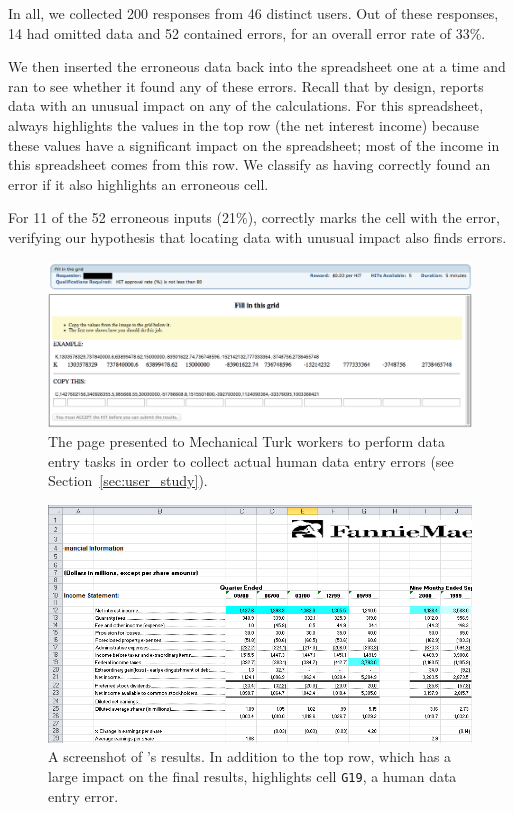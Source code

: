 In all, we collected 200 responses from 46 distinct users. Out of
these responses, 14 had omitted data and 52 contained errors, for an
overall error rate of 33\%.

We then inserted the erroneous data back into the spreadsheet one at a
time and ran \checkcell{} to see whether it found any of these
errors. Recall that by design, \checkcell{} reports data with an
unusual impact on any of the calculations. For this
spreadsheet, \checkcell{} always highlights the values in the top row
(the net interest income) because these values have a significant
impact on the spreadsheet; most of the income in this spreadsheet
comes from this row. We classify \checkcell{} as having correctly
found an error if it also highlights an erroneous cell.

For 11 of the 52 erroneous inputs (21\%), \checkcell{} correctly marks the
cell with the error, verifying our hypothesis that locating data with
unusual impact also finds errors.


\begin{figure}[!t]
\centering
\includegraphics[width=5in]{images/mturk_fuzz_task}
  \caption{The page presented to Mechanical Turk workers to perform data entry tasks in order to collect actual human data entry errors (see Section~\ref{sec:user_study}).\label{fig:mturk_task}}
\end{figure}


\begin{figure}[!t]
\centering
\includegraphics[width=5in]{images/fannie_mae_outlier}
  \caption{A screenshot of \checkcell{}'s results. In addition to the top row, which has a large impact on the final results, \checkcell{} highlights cell \texttt{G19}, a human data entry error.\label{fig:fannie_mae}}
\end{figure}


